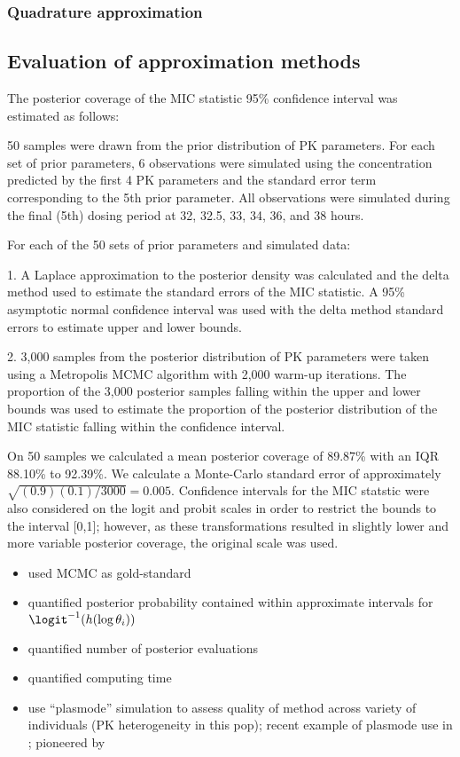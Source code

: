 \documentclass{article}
\begin{document}
\subsubsection{Quadrature approximation}
\subsection{Evaluation of approximation methods}


The posterior coverage of the MIC statistic 95\% confidence interval was estimated as follows:
 
50 samples were drawn from the prior distribution of PK parameters. For each set of prior parameters, 6 observations were simulated using the concentration predicted by the first 4 PK parameters and the standard error term corresponding to the 5th prior parameter. All observations were simulated during the final (5th) dosing period at 32, 32.5, 33, 34, 36, and 38 hours. 

For each of the 50 sets of prior parameters and simulated data:
 	
	1. A Laplace approximation to the posterior density was calculated and the delta method used to estimate the standard errors of the MIC statistic. A 95\% asymptotic normal confidence interval was used with the delta method standard errors to estimate upper and lower bounds.
	
	2. 3,000 samples from the posterior distribution of PK parameters were taken using a Metropolis MCMC algorithm with 2,000 warm-up iterations. The proportion of the 3,000 posterior samples falling within the upper and lower bounds was used to estimate the proportion of the posterior distribution of the MIC statistic falling within the confidence interval. 
		
On 50 samples we calculated a mean posterior coverage of 89.87\% with an IQR 88.10\% to 92.39\%. We calculate a Monte-Carlo standard error of approximately $\sqrt{(0.9)(0.1)/3000} = 0.005$. Confidence intervals for the MIC statstic were also considered on the logit and probit scales in order to restrict the bounds to the interval [0,1]; however, as these transformations resulted in slightly lower and more variable posterior coverage, the original scale was used. 
		

\begin{itemize}
\item used MCMC as gold-standard
\item quantified posterior probability contained within approximate intervals for $\logit^{-1}(h(\log \theta_i))$
\item quantified number of posterior evaluations
\item quantified computing time
\item use ``plasmode'' simulation to assess quality of method across variety of individuals (PK heterogeneity in this pop); recent example of plasmode use in \cite{Franklin2014}; pioneered by \cite{Vaughan2009}
\end{itemize}
\end{document}

